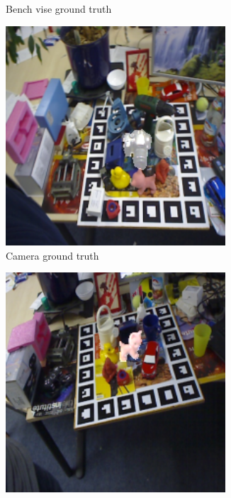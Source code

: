\documentclass[../main.tex]{subfiles}
\begin{document}
\begin{figure}[H]
\begin{subfigure}[t]{0.19\textwidth}
        \caption{Bench vise ground truth}
        \label{subfig:bench_vise_ground_truth}
    \end{subfigure}
    \begin{subfigure}[t]{0.19\textwidth}
        \centering
        \captionsetup{width=.9\textwidth}
        \includegraphics[width=0.9\textwidth]{figures/segmentation/cam_gt.png}
        \caption{Camera ground truth}
        \label{subfig:cam_ground_truth}
    \end{subfigure}
    \begin{subfigure}[t]{0.19\textwidth}
        \centering
        \captionsetup{width=.9\textwidth}
        \includegraphics[width=0.9\textwidth]{figures/segmentation/cat_gt.png}

\end{subfigure}
\end{figure}
\end{document}
